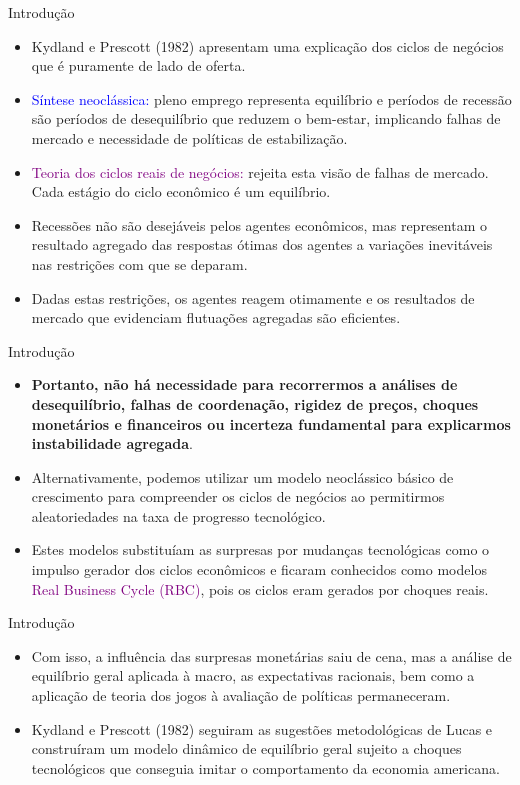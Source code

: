 \documentclass[10pt]{beamer}
\begin{document}
\begin{frame}{Introdução}
    \begin{itemize}
        \item Kydland e Prescott (1982) apresentam uma explicação dos ciclos de negócios que é puramente de lado de oferta.
        \bigskip
        \item \textcolor{blue}{Síntese neoclássica:} pleno emprego representa equilíbrio e períodos de recessão são períodos de desequilíbrio que reduzem o bem-estar, implicando falhas de mercado e necessidade de políticas de estabilização.
        \bigskip
        \item \textcolor{purple}{Teoria dos ciclos reais de negócios:} rejeita esta visão de falhas de mercado. Cada estágio do ciclo econômico é um equilíbrio.
        \bigskip
        \item Recessões não são desejáveis pelos agentes econômicos, mas representam o resultado agregado das respostas ótimas dos agentes a variações inevitáveis nas restrições com que se deparam.
        \bigskip
        \item Dadas estas restrições, os agentes reagem otimamente e os resultados de mercado que evidenciam flutuações agregadas são eficientes.
    \end{itemize}
\end{frame}

\begin{frame}{Introdução}
    \begin{itemize}
        \item \textbf{Portanto, não há necessidade para recorrermos a análises de desequilíbrio, falhas de coordenação, rigidez de preços, choques monetários e financeiros ou incerteza fundamental para explicarmos instabilidade agregada}.
        \bigskip
        \item Alternativamente, podemos utilizar um modelo neoclássico básico de crescimento para compreender os ciclos de negócios ao permitirmos aleatoriedades na taxa de progresso tecnológico.
        \bigskip
        \item Estes modelos substituíam as surpresas por mudanças tecnológicas
como o impulso gerador dos ciclos econômicos e ficaram conhecidos
como modelos \textcolor{purple}{Real Business Cycle (RBC)}, pois os ciclos eram
gerados por choques reais.
    \end{itemize}
\end{frame}

\begin{frame}{Introdução}
    \begin{itemize}
        \item Com isso, a influência das surpresas monetárias saiu de cena, mas a
análise de equilíbrio geral aplicada à macro, as expectativas racionais,
bem como a aplicação de teoria dos jogos à avaliação de políticas
permaneceram.
\bigskip
\item Kydland e Prescott (1982) seguiram as sugestões metodológicas de
Lucas e construíram um modelo dinâmico de equilíbrio geral sujeito a
choques tecnológicos que conseguia imitar o comportamento da
economia americana.
    \end{itemize}
\end{frame}
\end{document}
